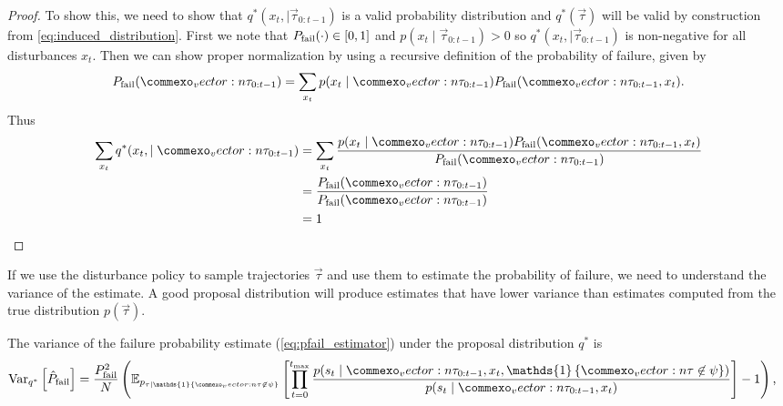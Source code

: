 \begin{proof}
To show this, we need to show that $q^*(x_t, \mid \vec{\tau}_{0:t-1})$ is a valid probability distribution and $q^*(\vec{\tau})$ will be valid by construction from \cref{eq:induced_distribution}. First we note that $P_{\rm fail}(\cdot) \in [0,1]$ and $p(x_t \mid \vec{\tau}_{0:t-1}) > 0$ so $q^*(x_t, \mid \vec{\tau}_{0:t-1})$ is non-negative for all disturbances $x_t$. Then we can show proper normalization by using a recursive definition of the probability of failure, given by 
\begin{equation}
    P_{\rm fail}(\vec{\tau}_{0:t-1}) = \sum_{x_t} p(x_t \mid \vec{\tau}_{0:t-1}) P_{\rm fail}(\vec{\tau}_{0:t-1}, x_t) \text{.}
\end{equation}
Thus
\begin{align}
    \sum_{x_t} q^*(x_t, \mid \vec{\tau}_{0:t-1}) &= \sum_{x_t} \frac{p(x_t \mid \vec{\tau}_{0:t-1}) P_{\rm fail}(\vec{\tau}_{0:t-1}, x_t)}{P_{\rm fail}(\vec{\tau}_{0:t-1})} \\
    &= \frac{P_{\rm fail}(\vec{\tau}_{0:t-1})}{P_{\rm fail}(\vec{\tau}_{0:t-1})} \\
    &= 1
\end{align}
\end{proof}

If we use the disturbance policy to sample trajectories $\vec{\tau}$ and use them to estimate the probability of failure, we need to understand the variance of the estimate. A good proposal distribution will produce estimates that have lower variance than estimates computed from the true distribution $p(\vec{\tau})$.

\begin{proposition}
The variance of the failure probability estimate (\cref{eq:pfail_estimator}) under the proposal distribution $q^*$ is
\begin{align}
    \text{Var}_{q^*}\left[ \hat{P}_{\rm fail} \right] &= \frac{P_{\rm fail}^2}{N} \left( \mathbb{E}_{p_{\tau \mid \mathds{1} \{\vec{\tau} \not \in \psi\}}}  \left[ \prod_{t=0}^{t_{\rm max}} \frac{p(s_t \mid \vec{\tau}_{0:t-1}, x_t, \mathds{1} \left\{ \vec{\tau} \not \in \psi \right\})}{p(s_t \mid \vec{\tau}_{0:t-1}, x_t)} \right] - 1 \right) \text{,}
\end{align}
\end{proposition}

